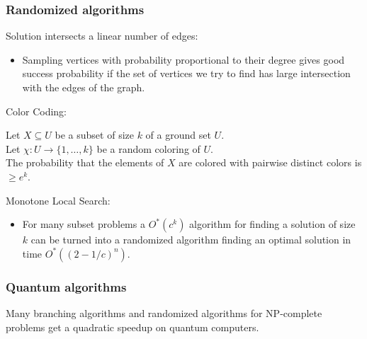 %	
%			


\begin{frame}
 \frametitle{Randomized algorithms}
 
 Solution intersects a linear number of edges:
 \begin{itemize}
 	\item Sampling vertices with probability proportional to their degree gives good success probability if the set of vertices we try to find has large intersection with the edges of the graph.
 \end{itemize}
 
 Color Coding:
 \begin{lemma}
  Let $X\subseteq U$ be a subset of size $k$ of a ground set $U$.\\
  Let $\chi: U\rightarrow \{1,\dots,k\}$ be a random coloring of $U$.\\
  The probability that the elements of $X$ are colored with pairwise distinct colors is $\ge e^k$.  
 \end{lemma}

 Monotone Local Search:
 \begin{itemize}
	\item For many subset problems a $O^*(c^k)$ algorithm for finding a solution of size $k$ can be turned into a randomized algorithm finding an optimal solution in time $O^*((2-1/c)^n)$.
\end{itemize}

\end{frame}

\begin{frame}
	\frametitle{Quantum algorithms}
	
	Many branching algorithms and randomized algorithms for NP-complete problems get a quadratic speedup on quantum computers.

\end{frame}

